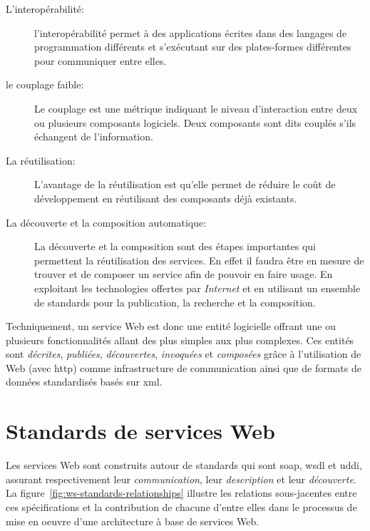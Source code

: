   \renewcommand{\descriptionlabel}[1]{\hspace{0.5cm}\textbullet~\textsf{#1}}
  \begin{description}
  \item [L'interopérabilité:] l'interopérabilité permet à des
    applications écrites dans des langages de programmation différents
    et s'exécutant sur des plates-formes différentes pour communiquer
    entre elles.

  \item [le couplage faible:] Le couplage est une métrique indiquant
    le niveau d'interaction entre deux ou plusieurs composants
    logiciels. Deux composants sont dits couplés s'ils échangent de
    l'information.

  \item [La réutilisation:] L'avantage de la réutilisation est qu'elle
    permet de réduire le coût de développement en réutilisant
    des composants déjà existants.

  \item [La découverte et la composition automatique:] La découverte
    et la composition sont des étapes importantes qui permettent la
    réutilisation des services. En effet il faudra être en mesure de
    trouver et de composer un service afin de pouvoir en faire
    usage. En exploitant les technologies offertes par
    \textit{Internet} et en utilisant un ensemble de standards pour la
    publication, la recherche et la composition.
  \end{description}
  \enddescription

  Techniquement, un service Web est donc une entité logicielle offrant
  une ou plusieurs fonctionnalités allant des plus simples aux plus
  complexes. Ces entités sont \emph{décrites}, \emph{publiées},
  \emph{découvertes}, \emph{invoquées} et \emph{composées} grâce à
  l'utilisation de Web (avec \acrshort{http}) comme infrastructure de
  communication ainsi que de formats de données standardisés basés sur
  \acrshort{xml}.

\section{Standards de services Web}
\label{sec:ws-standards}
Les services Web sont construits autour de standards qui sont
\acrshort{soap}, \acrshort{wsdl} et \acrshort{uddi}, assurant
respectivement leur \emph{communication}, leur \emph{description} et
leur \emph{découverte}. La figure~\ref{fig:ws-standards-relationships}
illustre les relations sous-jacentes entre ces spécifications et la
contribution de chacune d'entre elles dans le processus de mise en oeuvre
d'une architecture à base de services Web.\bigskip

